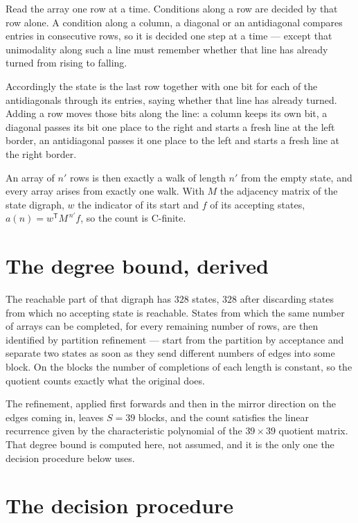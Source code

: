 \documentclass[11pt]{article}
\theoremstyle{definition}
\begin{document}
Read the array one row at a time. Conditions along a row are decided by that row alone. A condition along a column, a diagonal or an antidiagonal compares entries in consecutive rows, so it is decided one step at a time --- except that unimodality along such a line must remember whether that line has already turned from rising to falling.

Accordingly the state is the last row together with one bit for each of the antidiagonals through its entries, saying whether that line has already turned. Adding a row moves those bits along the line: a column keeps its own bit, a diagonal passes its bit one place to the right and starts a fresh line at the left border, an antidiagonal passes it one place to the left and starts a fresh line at the right border.

An array of $n'$ rows is then exactly a walk of length $n'$ from the empty state, and every array arises from exactly one walk. With $M$ the adjacency matrix of the state digraph, $w$ the indicator of its start and $f$ of its accepting states, $a(n) = w^{\mathsf T}M^{\,n'}f$, so the count is C-finite.

\section{The degree bound, derived}

The reachable part of that digraph has $328$ states, $328$ after discarding states from which no accepting state is reachable. States from which the same number of arrays can be completed, for every remaining number of rows, are then identified by partition refinement --- start from the partition by acceptance and separate two states as soon as they send different numbers of edges into some block. On the blocks the number of completions of each length is constant, so the quotient counts exactly what the original does.

The refinement, applied first forwards and then in the mirror direction on the edges coming in, leaves $S = 39$ blocks, and the count satisfies the linear recurrence given by the characteristic polynomial of the $39 \times 39$ quotient matrix. That degree bound is computed here, not assumed, and it is the only one the decision procedure below uses.

\section{The decision procedure}
\end{document}
